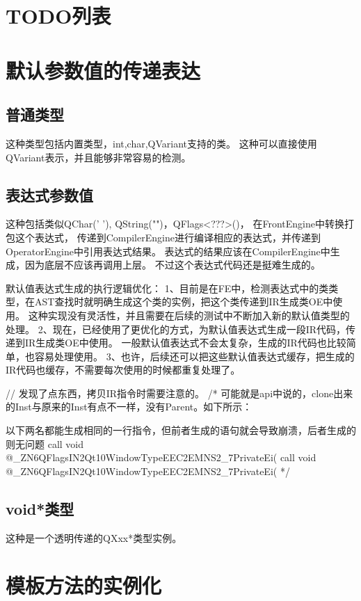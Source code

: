 \section{TODO列表}


\section{默认参数值的传递表达}
\subsection{普通类型}
这种类型包括内置类型，int,char,QVariant支持的类。
这种可以直接使用QVariant表示，并且能够非常容易的检测。

\subsection{表达式参数值}
这种包括类似QChar(' '), QString("")，QFlags<???>()，
在FrontEngine中转换打包这个表达式，
传递到CompilerEngine进行编译相应的表达式，并传递到OperatorEngine中引用表达式结果。
表达式的结果应该在CompilerEngine中生成，因为底层不应该再调用上层。
不过这个表达式代码还是挺难生成的。

默认值表达式生成的执行逻辑优化：
1、目前是在FE中，检测表达式中的类类型，在AST查找时就明确生成这个类的实例，把这个类传递到IR生成类OE中使用。
这种实现没有灵活性，并且需要在后续的测试中不断加入新的默认值类型的处理。
2、现在，已经使用了更优化的方式，为默认值表达式生成一段IR代码，传递到IR生成类OE中使用。
一般默认值表达式不会太复杂，生成的IR代码也比较简单，也容易处理使用。
3、也许，后续还可以把这些默认值表达式缓存，把生成的IR代码也缓存，不需要每次使用的时候都重复处理了。

// 发现了点东西，拷贝IR指令时需要注意的。
/*
  可能就是api中说的，clone出来的Inst与原来的Inst有点不一样，没有Parent。如下所示：

  以下两名都能生成相同的一行指令，但前者生成的语句就会导致崩溃，后者生成的则无问题
  call void @_ZN6QFlagsIN2Qt10WindowTypeEEC2EMNS2_7PrivateEi(%
  call void @_ZN6QFlagsIN2Qt10WindowTypeEEC2EMNS2_7PrivateEi(%
*/


\subsection{void*类型}
这种是一个透明传递的QXxx*类型实例。

\section{模板方法的实例化}

